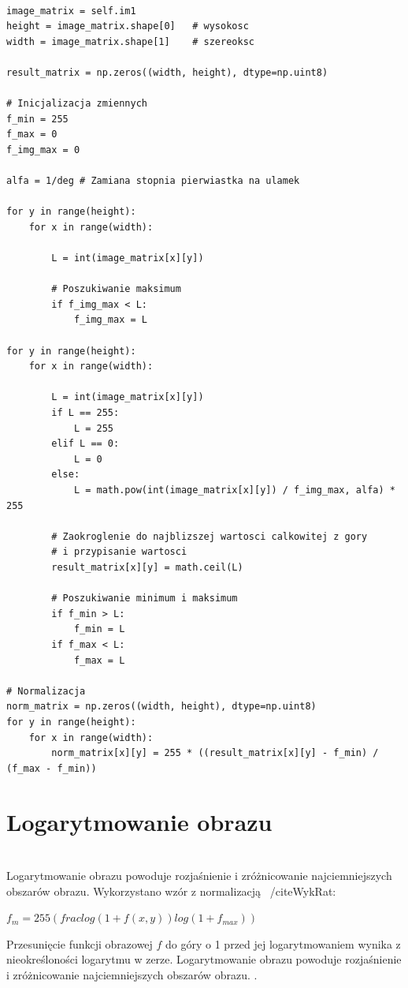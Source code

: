 \documentclass[final,a4paper,openany,12pt]{mwbk}
\begin{document}
\begin{lstlisting}[caption=Pierwiastkowanie obrazu szarego]

image_matrix = self.im1
height = image_matrix.shape[0]   # wysokosc
width = image_matrix.shape[1]    # szereoksc

result_matrix = np.zeros((width, height), dtype=np.uint8)

# Inicjalizacja zmiennych
f_min = 255
f_max = 0
f_img_max = 0

alfa = 1/deg # Zamiana stopnia pierwiastka na ulamek

for y in range(height):
    for x in range(width):  
        
        L = int(image_matrix[x][y])

        # Poszukiwanie maksimum
        if f_img_max < L:
            f_img_max = L

for y in range(height):
    for x in range(width):  
        
        L = int(image_matrix[x][y])
        if L == 255:
            L = 255
        elif L == 0:
            L = 0
        else:
            L = math.pow(int(image_matrix[x][y]) / f_img_max, alfa) * 255

        # Zaokroglenie do najblizszej wartosci calkowitej z gory
        # i przypisanie wartosci
        result_matrix[x][y] = math.ceil(L)

        # Poszukiwanie minimum i maksimum
        if f_min > L:
            f_min = L
        if f_max < L:
            f_max = L

# Normalizacja
norm_matrix = np.zeros((width, height), dtype=np.uint8)
for y in range(height):
    for x in range(width):
        norm_matrix[x][y] = 255 * ((result_matrix[x][y] - f_min) / (f_max - f_min))

\end{lstlisting}

\section {Logarytmowanie obrazu}
\hfill\\
\indent
Logarytmowanie obrazu powoduje rozjaśnienie i zróżnicowanie najciemniejszych obszarów obrazu.
Wykorzystano wzór z normalizacją ~/cite{WykRat}:
	
	\begin{center}
		$f_{m} = 255(frac{log(1 + f(x,y))}{log(1 + f_{max})})$
	\end{center}

	
Przesunięcie funkcji obrazowej $f$ do góry o 1 przed jej logarytmowaniem wynika z nieokreśloności logarytmu w zerze. Logarytmowanie obrazu powoduje rozjaśnienie i zróżnicowanie najciemniejszych obszarów obrazu. .	
\end{document}
